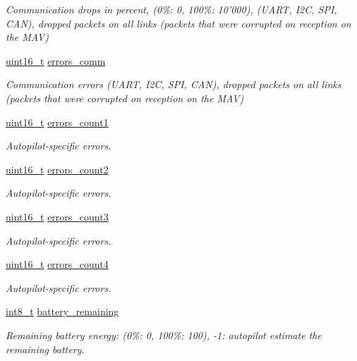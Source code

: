 \begin{DoxyCompactItemize}
\begin{DoxyCompactList}\small\item\em Communication drops in percent, (0\%\-: 0, 100\%\-: 10'000), (U\-A\-R\-T, I2\-C, S\-P\-I, C\-A\-N), dropped packets on all links (packets that were corrupted on reception on the M\-A\-V) \end{DoxyCompactList}\item 
\hyperlink{stdint_8h_a273cf69d639a59973b6019625df33e30}{uint16\-\_\-t} \hyperlink{struct____mavlink__sys__status__t_af144d0a152da70babf5ec86593e88700}{errors\-\_\-comm}
\begin{DoxyCompactList}\small\item\em Communication errors (U\-A\-R\-T, I2\-C, S\-P\-I, C\-A\-N), dropped packets on all links (packets that were corrupted on reception on the M\-A\-V) \end{DoxyCompactList}\item 
\hyperlink{stdint_8h_a273cf69d639a59973b6019625df33e30}{uint16\-\_\-t} \hyperlink{struct____mavlink__sys__status__t_a11e2c7144a8d17da05c2f070d919bfc5}{errors\-\_\-count1}
\begin{DoxyCompactList}\small\item\em Autopilot-\/specific errors. \end{DoxyCompactList}\item 
\hyperlink{stdint_8h_a273cf69d639a59973b6019625df33e30}{uint16\-\_\-t} \hyperlink{struct____mavlink__sys__status__t_a5a67792e19997897a415af3b4dba3d68}{errors\-\_\-count2}
\begin{DoxyCompactList}\small\item\em Autopilot-\/specific errors. \end{DoxyCompactList}\item 
\hyperlink{stdint_8h_a273cf69d639a59973b6019625df33e30}{uint16\-\_\-t} \hyperlink{struct____mavlink__sys__status__t_aafca91f6177e4d0ed71410ac5b8f4ac8}{errors\-\_\-count3}
\begin{DoxyCompactList}\small\item\em Autopilot-\/specific errors. \end{DoxyCompactList}\item 
\hyperlink{stdint_8h_a273cf69d639a59973b6019625df33e30}{uint16\-\_\-t} \hyperlink{struct____mavlink__sys__status__t_a05303107ce28241b401f6383e6d6e634}{errors\-\_\-count4}
\begin{DoxyCompactList}\small\item\em Autopilot-\/specific errors. \end{DoxyCompactList}\item 
\hyperlink{stdint_8h_ad566f6541e98b74246db1a3a3a85ad49}{int8\-\_\-t} \hyperlink{struct____mavlink__sys__status__t_a89ff7e5cb3d8a698ace5c6653479b71e}{battery\-\_\-remaining}
\begin{DoxyCompactList}\small\item\em Remaining battery energy\-: (0\%\-: 0, 100\%\-: 100), -\/1\-: autopilot estimate the remaining battery. \end{DoxyCompactList}\end{DoxyCompactItemize}


